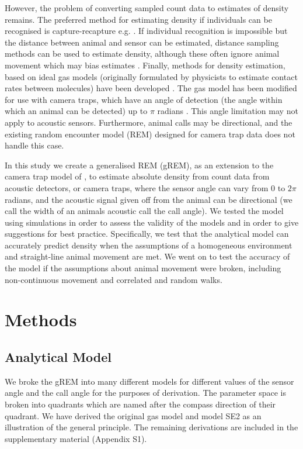 \documentclass[a4paper,10pt,reqno,oneside]{amsart}
\begin{document}
However, the problem of converting sampled count data to estimates of density remains. The preferred method for estimating density if individuals can be recognised is capture-recapture e.g. \citep{karanth1995, trolle2003estimation, soisalo2006estimating, trolle2007camera}. If individual recognition is impossible but the distance between animal and sensor can be estimated, distance sampling methods can be used to estimate density, although these often ignore animal movement which may bias estimates \citep{barlow2005estimates, marques2011estimating}. Finally, methods for density estimation, based on ideal gas models (originally formulated by physicists to estimate contact rates between molecules) have been developed \citep{yapp1956theory, Hutchinson_Waser_2007}. The gas model has been modified for use with camera traps, which have an angle of detection (the angle within which an animal can be detected)  up to $\pi$ radians \citep{rowcliffe2008estimating}. This angle limitation may not apply to acoustic sensors. Furthermore, animal calls may be directional, and the existing random encounter model (REM) designed for camera trap data does not handle this case.

In this study we create a generalised REM (gREM), as an extension to the camera trap model of \cite{rowcliffe2008estimating}, to estimate absolute density from count data from acoustic detectors, or camera traps, where the sensor angle can vary from 0 to $2\pi$ radians, and the acoustic signal given off from the animal can be directional (we call the width of an animals acoustic call the call angle).  We tested the model using simulations in order to assess the validity of the models and in order to give suggestions for best practice. Specifically, we test that the analytical model can accurately predict density when the assumptions of a homogeneous environment and straight-line animal movement are met. We went on to test the accuracy of the model if the assumptions about animal movement were broken, including non-continuous movement and correlated and random walks. 

\section{Methods}

\subsection{Analytical Model}

We broke the gREM into many different models for different values of the sensor angle and the call angle for the purposes of derivation. The parameter space is broken into quadrants which are named after the compass direction of their quadrant. We have derived the original gas model and model SE2 as an illustration of the general principle. The remaining derivations are included in the supplementary material (Appendix S1).
\end{document}
